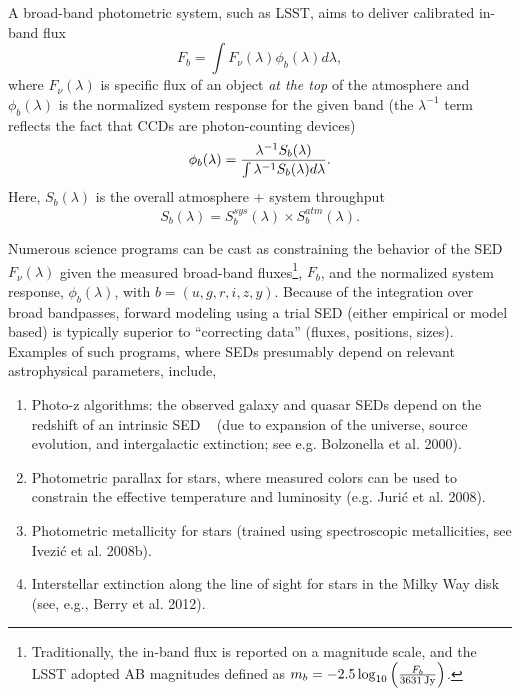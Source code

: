 \documentclass{iau}
\begin{document}
A broad-band photometric system, such as LSST, aims to deliver calibrated in-band flux
\begin{equation}
\label{Fb}
             F_b = \int{F_\nu(\lambda) \phi_b(\lambda) d\lambda},
\end{equation}
where $F_\nu(\lambda)$ is specific flux of an object {\it at the top} of 
the atmosphere and $\phi_b(\lambda)$ is the normalized system response 
for the given band (the $\lambda^{-1}$  term reflects the fact that CCDs 
are photon-counting devices)
\begin{equation}
\label{PhiDef}
\phi_b(\lambda) = {\lambda^{-1} S_b(\lambda) \over \int{\lambda^{-1} S_b(\lambda) d\lambda}}.
\end{equation}
Here, $S_b(\lambda)$ is the overall atmosphere + system throughput
\begin{equation}
\label{SDef}
         S_b(\lambda) = S_b^{sys}(\lambda) \times S_b^{atm}(\lambda). 
\end{equation}

Numerous science programs can be cast as constraining the behavior of the SED 
$F_\nu(\lambda)$ given the measured broad-band fluxes\footnote{Traditionally, the in-band flux is 
reported on a magnitude scale, and the LSST adopted AB magnitudes defined as 
$m_b = -2.5\log_{10}\left({F_b \over 3631 \, {\rm Jy}}\right)$.}, $F_b$, and the 
normalized system response, $\phi_b(\lambda)$, with
$b=(u,g,r,i,z,y)$. Because of the integration 
over broad bandpasses, forward modeling using a trial SED (either empirical or model based) is 
typically superior to ``correcting data'' (fluxes, positions, sizes). Examples of such programs, 
where SEDs presumably depend on relevant astrophysical parameters, include, 
\begin{enumerate}
\item Photo-z algorithms: the observed galaxy and quasar SEDs depend on the redshift of an intrinsic SED  
(due to expansion of the universe, source evolution, and intergalactic extinction; see e.g. Bolzonella et al. 2000). 
\item Photometric parallax for stars, where measured colors can be used to constrain the effective
          temperature  and luminosity (e.g. Juri\'{c} et al. 2008). 
\item Photometric metallicity for stars (trained using spectroscopic metallicities, see Ivezi\'{c} et al. 2008b). 
\item Interstellar extinction along the line of sight for stars in the Milky Way disk (see, e.g., Berry et al. 2012). 
\end{enumerate}
\end{document}
